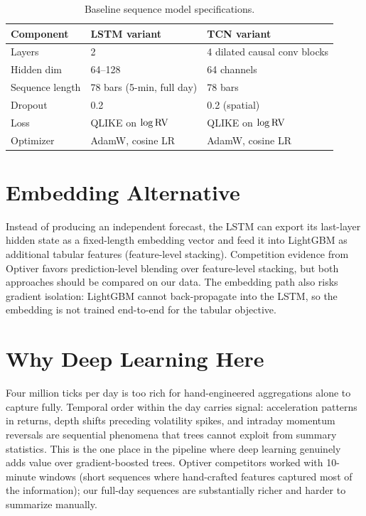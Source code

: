 \begin{table}[ht]
\centering
\caption{Baseline sequence model specifications.}
\label{tab:lstm-spec}
\begin{tabular}{@{}lll@{}}
\toprule
Component & LSTM variant & TCN variant \\
\midrule
Layers         & 2            & 4 dilated causal conv blocks \\
Hidden dim     & 64--128      & 64 channels \\
Sequence length & 78 bars (5-min, full day) & 78 bars \\
Dropout        & 0.2          & 0.2 (spatial) \\
Loss           & QLIKE on $\log \operatorname{RV}$ & QLIKE on $\log \operatorname{RV}$ \\
Optimizer      & AdamW, cosine LR & AdamW, cosine LR \\
\bottomrule
\end{tabular}
\end{table}

\section{Embedding Alternative}

Instead of producing an independent forecast, the LSTM can export its last-layer hidden state as a fixed-length embedding vector and feed it into LightGBM as additional tabular features (feature-level stacking).
Competition evidence from Optiver \citep{Optiver2021} favors prediction-level blending over feature-level stacking, but both approaches should be compared on our data.
The embedding path also risks gradient isolation: LightGBM cannot back-propagate into the LSTM, so the embedding is not trained end-to-end for the tabular objective.

\section{Why Deep Learning Here}

Four million ticks per day is too rich for hand-engineered aggregations alone to capture fully.
Temporal order within the day carries signal: acceleration patterns in returns, depth shifts preceding volatility spikes, and intraday momentum reversals are sequential phenomena that trees cannot exploit from summary statistics.
This is the one place in the pipeline where deep learning genuinely adds value over gradient-boosted trees.
Optiver competitors worked with 10-minute windows (short sequences where hand-crafted features captured most of the information); our full-day sequences are substantially richer and harder to summarize manually.

